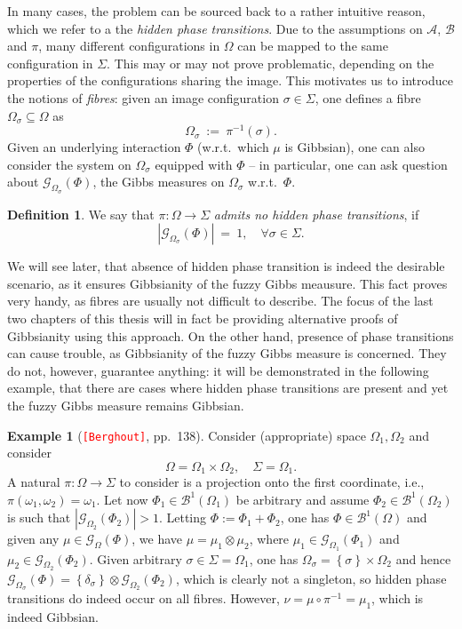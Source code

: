 \documentclass[12pt]{article}
\newcommand{\A}{\mathcal{A}}
\newcommand{\B}{\mathcal{B}}
\newcommand{\BB}{\mathscr{B}}
\newcommand{\G}{\mathcal{G}}
\newcommand{\set}[1]{\left\{#1\right\}}
\newcommand{\ra}{\rightarrow}
\newcommand{\1}{\mathbbm{1}}
\newcommand{\5}{\vspace{0.5cm}}
\theoremstyle{definition}
\newtheorem{ex}[thm]{Example}
\newtheorem{df}[thm]{Definition}
\begin{document}
In many cases, the problem can be sourced back to a rather intuitive reason, which we refer to a the \textit{hidden phase transitions}. Due to the assumptions on $\A$, $\B$ and $\pi$, many different configurations in $\Omega$ can be mapped to the same configuration in $\Sigma$. This may or may not prove problematic, depending on the properties of the configurations sharing the image. This motivates us to introduce the notions of \textit{fibres}: given an image configuration $\sigma\in\Sigma$, one defines a fibre $\Omega_\sigma\subseteq\Omega$ as
$$\Omega_\sigma ~:=~ \pi^{-1}(\sigma).$$
Given an underlying interaction $\Phi$ (w.r.t.~which $\mu$ is Gibbsian), one can also consider the system on $\Omega_\sigma$ equipped with $\Phi$ -- in particular, one can ask question about $\G_{\Omega_\sigma}(\Phi)$, the Gibbs measures on $\Omega_\sigma$ w.r.t.~$\Phi$. 
\begin{df}
We say that $\pi:\Omega\ra\Sigma$ \textit{admits no hidden phase transitions}, if 
$$|\G_{\Omega_\sigma}(\Phi)| ~=~ 1, \quad \forall \sigma\in\Sigma.$$
\end{df}
We will see later, that absence of hidden phase transition is indeed the desirable scenario, as it ensures Gibbsianity of the fuzzy Gibbs meausure. This fact proves very handy, as fibres are usually not difficult to describe. The focus of the last two chapters of this thesis will in fact be providing alternative proofs of Gibbsianity using this approach. On the other hand, presence of phase transitions can cause trouble, as Gibbsianity of the fuzzy Gibbs measure is concerned. They do not, however, guarantee anything: it will be demonstrated in the following example, that there are cases where hidden phase transitions are present and yet the fuzzy Gibbs measure remains Gibbsian.

\begin{ex}[\textcolor{red}{\texttt{[Berghout]}}, pp.~138]
Consider (appropriate) space $\Omega_1,\Omega_2$ and consider
$$\Omega=\Omega_1\times\Omega_2,\quad\Sigma=\Omega_1.$$
A natural $\pi:\Omega\ra\Sigma$ to consider is a projection onto the first coordinate, i.e., $\pi(\omega_1,\omega_2)=\omega_1$. Let now $\Phi_1\in\BB^1(\Omega_1)$ be arbitrary and assume $\Phi_2\in\BB^1(\Omega_2)$ is such that $|\G_{\Omega_2}(\Phi_2)|>1$. Letting $\Phi:=\Phi_1+\Phi_2$, one has $\Phi\in\BB^1(\Omega)$ and given any $\mu\in\G_{\Omega}(\Phi)$, we have $\mu=\mu_1\otimes\mu_2$, where $\mu_1\in\G_{\Omega_1}(\Phi_1)$ and $\mu_2\in\G_{\Omega_2}(\Phi_2)$. Given arbitrary $\sigma\in\Sigma=\Omega_1$, one has $\Omega_\sigma=\set{\sigma}\times\Omega_2$ and hence $\G_{\Omega_\sigma}(\Phi)=\set{\delta_\sigma}\otimes\G_{\Omega_2}(\Phi_2)$, which is clearly not a singleton, so hidden phase transitions do indeed occur on all fibres. However, $\nu=\mu\circ\pi^{-1}=\mu_1$, which is indeed Gibbsian.
\end{ex}
\end{document}
